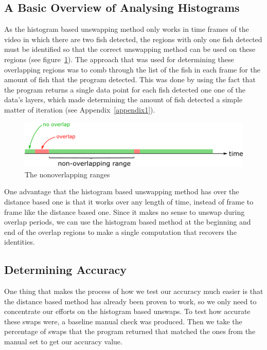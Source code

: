 \documentclass{article}
\begin{document}
\subsection{A Basic Overview of Analysing Histograms}

As the histogram based unswapping method only works in time frames of the video in which there are two fish detected, the regions with only one fish detected must be identified so that the correct unswapping method can be used on these regions (see figure~\ref{fig:nonoverlappingRange}). The approach that was used for determining these overlapping regions was to comb through the list of the fish in each frame for the amount of fish that the program detected. This was done by using the fact that the program returns a single data point for each fish detected one one of the data's layers, which made determining the amount of fish detected a simple matter of iteration (see Appendix~\ref{appendix1}).

\begin{figure}[H]
	\centering
	\includegraphics[width=\linewidth]{nonoverlappingRange}
	\caption{The nonoverlapping ranges}
	\label{fig:nonoverlappingRange}
\end{figure}

One advantage that the histogram based unswapping method has over the distance based one is that it works over any length of time, instead of frame to frame like the distance based one. Since it makes no sense to unswap during overlap periods, we can use the histogram based method at the beginning and end of the overlap regions to make a single computation that recovers the identities.

\subsection{Determining Accuracy}

One thing that makes the process of how we test our accuracy much easier is that the distance based method has already been proven to work, so we only need to concentrate our efforts on the histogram based unswaps. To test how accurate these swaps were, a baseline manual check was produced. Then we take the percentage of swaps that the program returned that matched the ones from the manual set to get our accuracy value.
\end{document}
